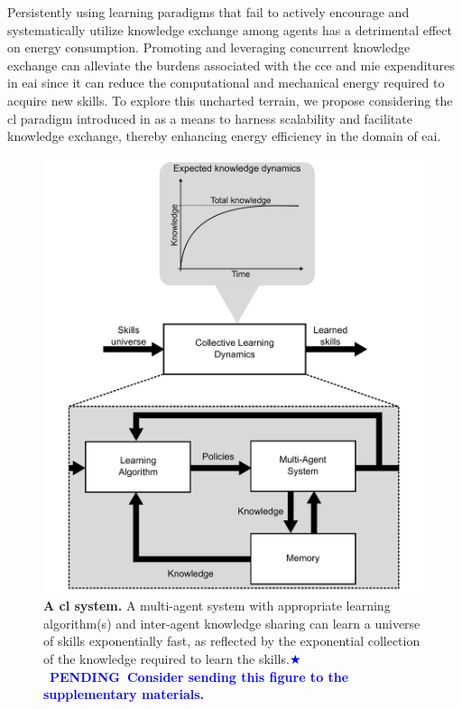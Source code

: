 \documentclass[12pt]{article}
\newcommand*{\pending}[1]{\textcolor{blue}{$\bigstar$~\textbf{PENDING~#1}}}
\begin{document}
Persistently using learning paradigms that fail to actively encourage and systematically utilize knowledge exchange among agents has a detrimental effect on energy consumption. Promoting and leveraging concurrent knowledge exchange can alleviate the burdens associated with the \ac{cce} and \ac{mie} expenditures in \ac{eai} since it can reduce the computational and mechanical energy required to acquire new skills. To explore this uncharted terrain, we propose considering the \ac{cl} paradigm introduced in \cite{Haddadin2014SystemzumErstellen,Haddadin2015Systemgeneratingsets} as a means to harness scalability and facilitate knowledge exchange, thereby enhancing energy efficiency in the domain of \acl{eai}.
\begin{figure}[t!]
	\centering
	\hspace*{\fill}
	\includegraphics[width=14cm]{closed_loop_collective_dynamics.png}
	\hspace*{\fill}
	\caption[] {\label{fig:collective_learning_system} \textbf{A \acl{cl} system.} {A multi-agent system with appropriate learning algorithm(s) and inter-agent knowledge sharing can learn a universe of skills exponentially fast, as reflected by the exponential collection of the knowledge required to learn the skills.}\pending{Consider sending this figure to the supplementary materials.}}
\end{figure}
\end{document}
